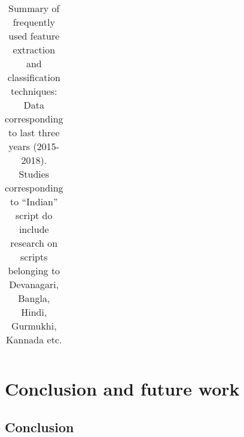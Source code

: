 \documentclass{article}
\begin{document}
\begin{landscape}
\begin{longtable}{| p{1.5cm} | p{16cm}| p{1.5cm}| p{1cm}|}
\caption{Summary of frequently used feature extraction and classification techniques: Data corresponding to last three years (2015-2018). Studies corresponding to ``Indian'' script do include research on scripts belonging to Devanagari, Bangla, Hindi, Gurmukhi, Kannada etc. }

\end{longtable}
\end{landscape}




\section{Conclusion and future work} \label{conclusion}

\subsection{Conclusion}
\end{document}
